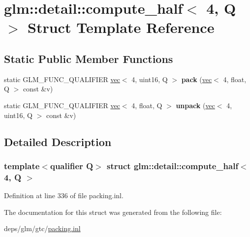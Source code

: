 \hypertarget{structglm_1_1detail_1_1compute__half_3_014_00_01Q_01_4}{}\section{glm\+:\+:detail\+:\+:compute\+\_\+half$<$ 4, Q $>$ Struct Template Reference}
\label{structglm_1_1detail_1_1compute__half_3_014_00_01Q_01_4}
\subsection*{Static Public Member Functions}
\begin{DoxyCompactItemize}
\item 
\mbox{\label{structglm_1_1detail_1_1compute__half_3_014_00_01Q_01_4_a93c7385a66d5c429ed3c00f97618d704}} 
static G\+L\+M\+\_\+\+F\+U\+N\+C\+\_\+\+Q\+U\+A\+L\+I\+F\+I\+ER \hyperlink{structglm_1_1vec}{vec}$<$ 4, uint16, Q $>$ {\bfseries pack} (\hyperlink{structglm_1_1vec}{vec}$<$ 4, float, Q $>$ const \&v)
\item 
\mbox{\label{structglm_1_1detail_1_1compute__half_3_014_00_01Q_01_4_a0e7bc963552dffae7fc20fc5dc2e810e}} 
static G\+L\+M\+\_\+\+F\+U\+N\+C\+\_\+\+Q\+U\+A\+L\+I\+F\+I\+ER \hyperlink{structglm_1_1vec}{vec}$<$ 4, float, Q $>$ {\bfseries unpack} (\hyperlink{structglm_1_1vec}{vec}$<$ 4, uint16, Q $>$ const \&v)
\end{DoxyCompactItemize}


\subsection{Detailed Description}
\subsubsection*{template$<$qualifier Q$>$\newline
struct glm\+::detail\+::compute\+\_\+half$<$ 4, Q $>$}



Definition at line 336 of file packing.\+inl.



The documentation for this struct was generated from the following file\+:\begin{DoxyCompactItemize}
\item 
deps/glm/gtc/\hyperlink{packing_8inl}{packing.\+inl}\end{DoxyCompactItemize}
